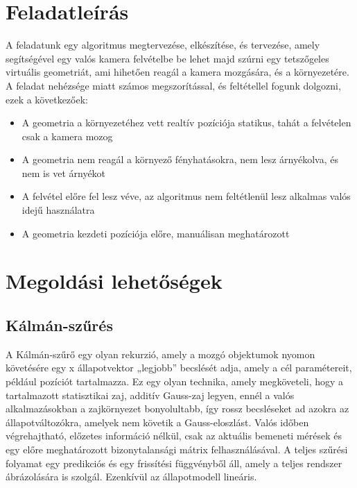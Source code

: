 \section{Feladatleírás}

A feladatunk egy algoritmus megtervezése, elkészítése, és tervezése, amely segítségével egy valós kamera felvételbe be lehet majd szúrni egy tetszőgeles virtuális geometriát, ami hihetően reagál a kamera mozgására, és a környezetére.
A feladat nehézsége miatt számos megszorítással, és feltétellel fogunk dolgozni, ezek a következőek:

\begin{itemize}
	\item A geometria a környezetéhez vett realtív pozíciója statikus, tahát a felvételen csak a kamera mozog
	\item A geometria nem reagál a környező fényhatásokra, nem lesz árnyékolva, és nem is vet árnyékot
	\item A felvétel előre fel lesz véve, az algoritmus nem feltétlenül lesz alkalmas valós idejű használatra
	\item A geometria kezdeti pozíciója előre, manuálisan meghatározott
\end{itemize}

\section{Megoldási lehetőségek\cite{yilmaz2006object}}

\subsection{Kálmán-szűrés}
A Kálmán-szűrő\cite{carvalho2021kalman} egy olyan rekurzió, amely a mozgó objektumok nyomon követésére egy x állapotvektor „legjobb” becslését adja, amely a cél paramétereit, például pozíciót tartalmazza. Ez egy olyan technika, amely megköveteli, hogy a tartalmazott statisztikai zaj, additív Gauss-zaj legyen, ennél a valós alkalmazásokban a zajkörnyezet bonyolultabb, így rossz becsléseket ad azokra az állapotváltozókra, amelyek nem követik a Gauss-eloszlást. Valós időben végrehajtható, előzetes információ nélkül, csak az aktuális bemeneti mérések és egy előre meghatározott bizonytalansági mátrix felhasználásával. A teljes szűrési folyamat egy predikciós és egy frissítési függvényből áll, amely a teljes rendszer ábrázolására is szolgál. Ezenkívül az állapotmodell lineáris.

